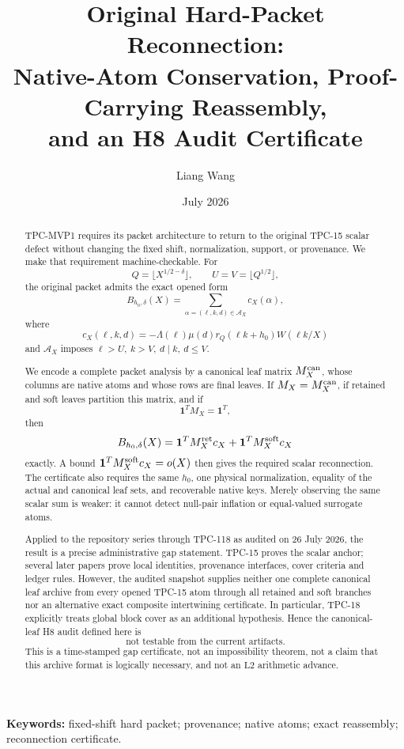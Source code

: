 \documentclass[11pt,a4paper]{article}
\title{\bfseries Original Hard-Packet Reconnection:\\
Native-Atom Conservation, Proof-Carrying Reassembly,\\
and an H8 Audit Certificate}
\author{Liang Wang}
\date{July 2026}
\theoremstyle{definition}
\theoremstyle{remark}
\newcommand{\one}{\mathbf 1}
\newcommand{\cA}{\mathcal A}
\newcommand{\Ltwo}{\mathrm{L2}}
\begin{document}
\maketitle

\begin{abstract}
TPC-MVP1 requires its packet architecture to return to the original
TPC-15 scalar defect without changing the fixed shift, normalization,
support, or provenance.  We make that requirement machine-checkable.
For
\[
 Q=\lfloor X^{1/2-\delta}\rfloor,\qquad
 U=V=\lfloor Q^{1/2}\rfloor,
\]
the original packet admits the exact opened form
\[
 B_{h_0,\delta}(X)
 =
 \sum_{\alpha=(\ell,k,d)\in\cA_X}c_X(\alpha),
\]
where
\[
 c_X(\ell,k,d)=
 -\Lambda(\ell)\mu(d)r_Q(\ell k+h_0)W(\ell k/X)
\]
and \(\cA_X\) imposes
\(\ell>U,\ k>V,\ d\mid k,\ d\le V\).

We encode a complete packet analysis by a canonical leaf matrix
\(M_X^{\rm can}\), whose columns are native atoms and whose rows are
final leaves.  If \(M_X=M_X^{\rm can}\), if retained and soft leaves
partition this matrix, and if
\[
 \one^TM_X=\one^T,
\]
then
\[
 B_{h_0,\delta}(X)
 =
 \one^TM_X^{\rm ret}c_X+
 \one^TM_X^{\rm soft}c_X
\]
exactly.  A bound
\(\one^TM_X^{\rm soft}c_X=o(X)\) then gives the required scalar
reconnection.  The certificate also requires the same \(h_0\), one
physical normalization, equality of the actual and canonical leaf
sets, and recoverable native keys.  Merely observing the same scalar
sum is weaker: it cannot detect null-pair inflation or equal-valued
surrogate atoms.

Applied to the repository series through TPC-118 as audited on
26 July 2026, the result is a precise administrative gap statement.
TPC-15 proves the scalar anchor; several later papers prove local
identities, provenance interfaces, cover criteria and ledger rules.
However, the audited snapshot supplies neither one complete canonical
leaf archive from every opened TPC-15 atom through all retained and
soft branches nor an alternative exact composite intertwining
certificate.  In particular, TPC-18 explicitly treats global block
cover as an additional hypothesis.  Hence the canonical-leaf H8 audit
defined here is
\[
 \boxed{\text{not testable from the current artifacts}.}
\]
This is a time-stamped gap certificate, not an impossibility theorem,
not a claim that this archive format is logically necessary, and not
an \(\Ltwo\) arithmetic advance.
\end{abstract}

\medskip
\noindent\textbf{Keywords:} fixed-shift hard packet; provenance;
native atoms; exact reassembly; reconnection certificate.
\end{document}
